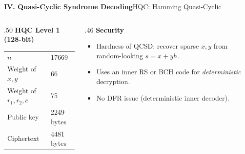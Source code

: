 \begin{frame}{\textbf{IV. Quasi-Cyclic Syndrome Decoding}}{HQC: Hamming Quasi-Cyclic}
\small
{}
\begin{columns}[T,onlytextwidth]
\begin{column}{.50\textwidth}
\textcolor{TealDarkCyan}{\textbf{HQC Level 1 (128-bit)}}
\begin{center}
\renewcommand{\arraystretch}{1.1}
\begin{tabular}{ll}
  $n$ & 17669 \\
  Weight of $x,y$ & 66 \\
  Weight of $r_1,r_2,e$ & 75 \\
  Public key & 2249 bytes \\
  Ciphertext & 4481 bytes \\
\end{tabular}
\end{center}
\end{column}
\begin{column}{.46\textwidth}
\textcolor{TealDarkCyan}{\textbf{Security}}
\begin{itemize}
  \item Hardness of QCSD: recover sparse $x,y$ from random-looking $s=x+yh$.
  \item Uses an inner RS or BCH code for \emph{deterministic} decryption.
  \item No DFR issue (deterministic inner decoder).
\end{itemize}
\end{column}
\end{columns}
\end{frame}

